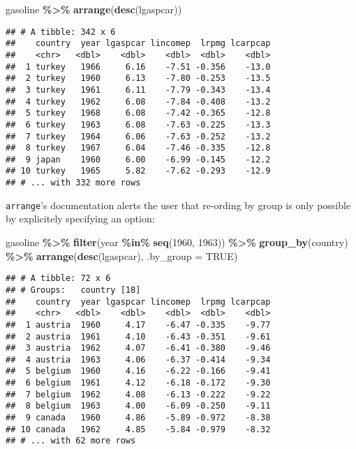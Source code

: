\documentclass[
]{article}
\newenvironment{Shaded}{\begin{snugshade}}{\end{snugshade}}
\newcommand{\DataTypeTok}[1]{\textcolor[rgb]{0.13,0.29,0.53}{#1}}
\newcommand{\DecValTok}[1]{\textcolor[rgb]{0.00,0.00,0.81}{#1}}
\newcommand{\KeywordTok}[1]{\textcolor[rgb]{0.13,0.29,0.53}{\textbf{#1}}}
\newcommand{\NormalTok}[1]{#1}
\newcommand{\OperatorTok}[1]{\textcolor[rgb]{0.81,0.36,0.00}{\textbf{#1}}}
\newcommand{\OtherTok}[1]{\textcolor[rgb]{0.56,0.35,0.01}{#1}}
\newcommand{\StringTok}[1]{\textcolor[rgb]{0.31,0.60,0.02}{#1}}
\begin{document}
\begin{Shaded}
\begin{Highlighting}[]
\NormalTok{gasoline }\OperatorTok{\%\textgreater{}\%}
\StringTok{  }\KeywordTok{arrange}\NormalTok{(}\KeywordTok{desc}\NormalTok{(lgaspcar))}
\end{Highlighting}
\end{Shaded}

\begin{verbatim}
## # A tibble: 342 x 6
##    country  year lgaspcar lincomep  lrpmg lcarpcap
##    <chr>   <dbl>    <dbl>    <dbl>  <dbl>    <dbl>
##  1 turkey   1966     6.16    -7.51 -0.356    -13.0
##  2 turkey   1960     6.13    -7.80 -0.253    -13.5
##  3 turkey   1961     6.11    -7.79 -0.343    -13.4
##  4 turkey   1962     6.08    -7.84 -0.408    -13.2
##  5 turkey   1968     6.08    -7.42 -0.365    -12.8
##  6 turkey   1963     6.08    -7.63 -0.225    -13.3
##  7 turkey   1964     6.06    -7.63 -0.252    -13.2
##  8 turkey   1967     6.04    -7.46 -0.335    -12.8
##  9 japan    1960     6.00    -6.99 -0.145    -12.2
## 10 turkey   1965     5.82    -7.62 -0.293    -12.9
## # ... with 332 more rows
\end{verbatim}

\texttt{arrange}'s documentation alerts the user that re-ording by group is only possible by explicitely
specifying an option:

\begin{Shaded}
\begin{Highlighting}[]
\NormalTok{gasoline }\OperatorTok{\%\textgreater{}\%}
\StringTok{  }\KeywordTok{filter}\NormalTok{(year }\OperatorTok{\%in\%}\StringTok{ }\KeywordTok{seq}\NormalTok{(}\DecValTok{1960}\NormalTok{, }\DecValTok{1963}\NormalTok{)) }\OperatorTok{\%\textgreater{}\%}
\StringTok{  }\KeywordTok{group\_by}\NormalTok{(country) }\OperatorTok{\%\textgreater{}\%}
\StringTok{  }\KeywordTok{arrange}\NormalTok{(}\KeywordTok{desc}\NormalTok{(lgaspcar), }\DataTypeTok{.by\_group =} \OtherTok{TRUE}\NormalTok{)}
\end{Highlighting}
\end{Shaded}

\begin{verbatim}
## # A tibble: 72 x 6
## # Groups:   country [18]
##    country  year lgaspcar lincomep  lrpmg lcarpcap
##    <chr>   <dbl>    <dbl>    <dbl>  <dbl>    <dbl>
##  1 austria  1960     4.17    -6.47 -0.335    -9.77
##  2 austria  1961     4.10    -6.43 -0.351    -9.61
##  3 austria  1962     4.07    -6.41 -0.380    -9.46
##  4 austria  1963     4.06    -6.37 -0.414    -9.34
##  5 belgium  1960     4.16    -6.22 -0.166    -9.41
##  6 belgium  1961     4.12    -6.18 -0.172    -9.30
##  7 belgium  1962     4.08    -6.13 -0.222    -9.22
##  8 belgium  1963     4.00    -6.09 -0.250    -9.11
##  9 canada   1960     4.86    -5.89 -0.972    -8.38
## 10 canada   1962     4.85    -5.84 -0.979    -8.32
## # ... with 62 more rows
\end{verbatim}
\end{document}
